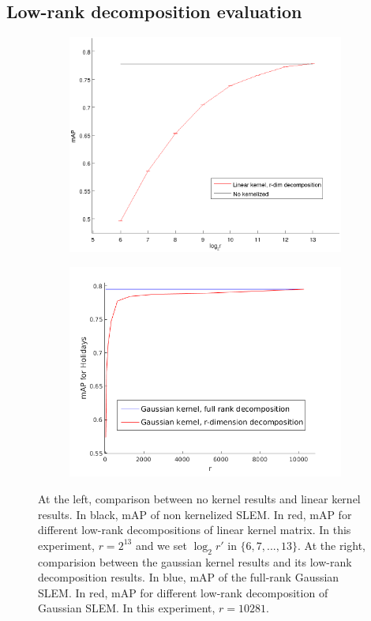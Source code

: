 \subsection{Low-rank decomposition evaluation}

\begin{figure}[!h]
\centering
\begin{subfigure}[b]{0.48\textwidth}
\includegraphics[width=\textwidth]{None_vs_linear.png}
\end{subfigure}
\begin{subfigure}[b]{0.48\textwidth}
\includegraphics[width=\textwidth]{rbf_decomposition_nolog.png}
\end{subfigure}
\caption{At the left, comparison between no kernel results and linear kernel results. In black, mAP of non kernelized SLEM. In red, mAP for different low-rank decompositions of linear kernel matrix. In this experiment, $r=2^{13}$ and we set $\log_2 r'$ in $\{6, 7,...,13\}$. At the right, comparision between the gaussian kernel results and its low-rank decomposition results. In blue, mAP of the full-rank Gaussian SLEM. In red, mAP for different low-rank decomposition of Gaussian SLEM. In this experiment, $r=10281$.}
\label{no.ker.vs.linear2}
\end{figure}

